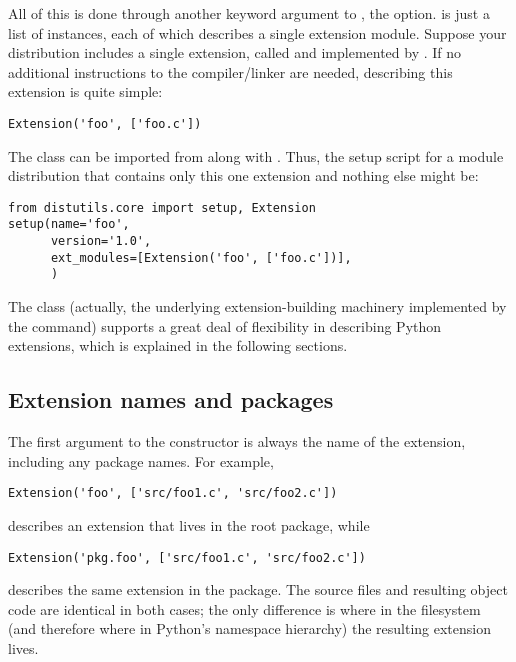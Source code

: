 \documentclass{manual}
\begin{document}
All of this is done through another keyword argument to
, the  option.  
is just a list of  instances, each of which describes a
single extension module.  Suppose your distribution includes a single
extension, called  and implemented by .  If no
additional instructions to the compiler/linker are needed, describing
this extension is quite simple:

\begin{verbatim}
Extension('foo', ['foo.c'])
\end{verbatim}

The  class can be imported from
 along with .  Thus, the setup
script for a module distribution that contains only this one extension
and nothing else might be:

\begin{verbatim}
from distutils.core import setup, Extension
setup(name='foo',
      version='1.0',
      ext_modules=[Extension('foo', ['foo.c'])],
      )
\end{verbatim}

The  class (actually, the underlying extension-building
machinery implemented by the  command) supports a
great deal of flexibility in describing Python extensions, which is
explained in the following sections.  


\subsection{Extension names and packages}

The first argument to the  constructor is always the
name of the extension, including any package names.  For example,

\begin{verbatim}
Extension('foo', ['src/foo1.c', 'src/foo2.c'])
\end{verbatim}

describes an extension that lives in the root package, while

\begin{verbatim}
Extension('pkg.foo', ['src/foo1.c', 'src/foo2.c'])
\end{verbatim}

describes the same extension in the  package.  The source
files and resulting object code are identical in both cases; the only
difference is where in the filesystem (and therefore where in Python's
namespace hierarchy) the resulting extension lives.
\end{document}
